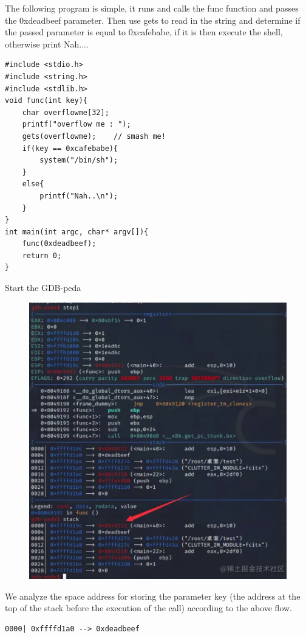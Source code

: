 \documentclass[a4paper]{exam}
\theoremstyle{definition}
\begin{document}
The following program is simple, it runs and calls the func function and passes the 0xdeadbeef parameter. Then use gets to read in the string and determine if the passed parameter is equal to 0xcafebabe, if it is then execute the shell, otherwise print Nah....
\begin{verbatim}
#include <stdio.h>
#include <string.h>
#include <stdlib.h>
void func(int key){
    char overflowme[32];
    printf("overflow me : ");
    gets(overflowme);    // smash me!
    if(key == 0xcafebabe){
        system("/bin/sh");
    }
    else{
        printf("Nah..\n");
    }
}
int main(int argc, char* argv[]){
    func(0xdeadbeef);
    return 0;
}
\end{verbatim}
Start the GDB-peda
\begin{figure}
\centering
\includegraphics[width=12cm]{./img/overflow_eg1.png}
\caption{}
\end{figure}

We analyze the space address for storing the parameter key (the address at the top of the stack before the execution of the call) according to the above flow.
\begin{verbatim}
0000| 0xffffd1a0 --> 0xdeadbeef 
\end{verbatim}
\end{document}
